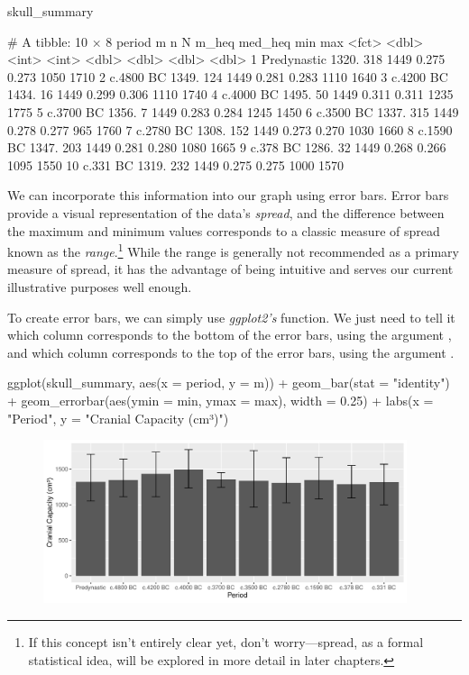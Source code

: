 \begin{inR}
skull_summary
\end{inR}

\begin{outR}
# A tibble: 10 × 8
   period          m     n     N m_heq med_heq   min   max
   <fct>       <dbl> <int> <int> <dbl>   <dbl> <dbl> <dbl>
 1 Predynastic 1320.   318  1449 0.275   0.273  1050  1710
 2 c.4800 BC   1349.   124  1449 0.281   0.283  1110  1640
 3 c.4200 BC   1434.    16  1449 0.299   0.306  1110  1740
 4 c.4000 BC   1495.    50  1449 0.311   0.311  1235  1775
 5 c.3700 BC   1356.     7  1449 0.283   0.284  1245  1450
 6 c.3500 BC   1337.   315  1449 0.278   0.277   965  1760
 7 c.2780 BC   1308.   152  1449 0.273   0.270  1030  1660
 8 c.1590 BC   1347.   203  1449 0.281   0.280  1080  1665
 9 c.378 BC    1286.    32  1449 0.268   0.266  1095  1550
10 c.331 BC    1319.   232  1449 0.275   0.275  1000  1570
\end{outR}

\noindent
We can incorporate this information into our graph using \glspl{error bar}. Error bars provide a visual representation of the data's \textit{spread}, and the difference between the maximum and minimum values corresponds to a classic measure of spread known as the \textit{range}.\footnote{If this concept isn’t entirely clear yet, don’t worry—spread, as a formal statistical idea, will be explored in more detail in later chapters.} While the range is generally not recommended as a primary measure of spread, it has the advantage of being intuitive and serves our current illustrative purposes well enough.

To create error bars, we can simply use \textit{ggplot2's}  function. We just need to tell it which column corresponds to the bottom of the error bars, using the argument , and which column corresponds to the top of the error bars, using the argument .

\begin{inRhigh}[highlightlines={3}]
ggplot(skull_summary, aes(x = period, y = m)) +
  geom_bar(stat = "identity") +
  geom_errorbar(aes(ymin = min, ymax = max), width = 0.25) +
  labs(x = "Period", y = "Cranial Capacity (cm³)")
\end{inRhigh}

\vspace{2em}

\begin{figure}[H]
\includegraphics[width = 0.95\textwidth]{graphics/ch3Figs/bar_4.pdf}
\end{figure}

